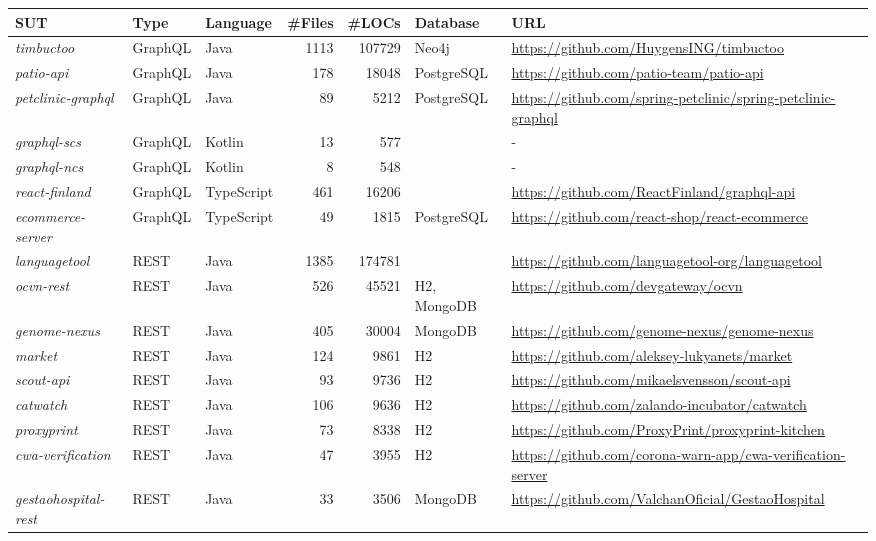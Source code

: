 \begin{tabular}{lll rr ll}\\ 
\toprule 
SUT & Type & Language & \#Files & \#LOCs & Database & URL \\ 
\midrule 
\emph{timbuctoo} &  GraphQL &  Java &  1113 &  107729 &  Neo4j & \url{https://github.com/HuygensING/timbuctoo} \\ 
\emph{patio-api} &  GraphQL &  Java &  178 &  18048 &  PostgreSQL & \url{https://github.com/patio-team/patio-api} \\ 
\emph{petclinic-graphql} &  GraphQL &  Java &  89 &  5212 &  PostgreSQL & \url{https://github.com/spring-petclinic/spring-petclinic-graphql} \\ 
\emph{graphql-scs} &  GraphQL &  Kotlin &  13 &  577 &   & -  \\ 
\emph{graphql-ncs} &  GraphQL &  Kotlin &  8 &  548 &   & -  \\ 
\emph{react-finland} &  GraphQL &  TypeScript &  461 &  16206 &   & \url{https://github.com/ReactFinland/graphql-api} \\ 
\emph{ecommerce-server} &  GraphQL &  TypeScript &  49 &  1815 &  PostgreSQL & \url{https://github.com/react-shop/react-ecommerce} \\ 
\emph{languagetool} &  REST &  Java &  1385 &  174781 &   & \url{https://github.com/languagetool-org/languagetool} \\ 
\emph{ocvn-rest} &  REST &  Java &  526 &  45521 &  H2, MongoDB & \url{https://github.com/devgateway/ocvn} \\ 
\emph{genome-nexus} &  REST &  Java &  405 &  30004 &  MongoDB & \url{https://github.com/genome-nexus/genome-nexus} \\ 
\emph{market} &  REST &  Java &  124 &  9861 &  H2 & \url{https://github.com/aleksey-lukyanets/market} \\ 
\emph{scout-api} &  REST &  Java &  93 &  9736 &  H2 & \url{https://github.com/mikaelsvensson/scout-api} \\ 
\emph{catwatch} &  REST &  Java &  106 &  9636 &  H2 & \url{https://github.com/zalando-incubator/catwatch} \\ 
\emph{proxyprint} &  REST &  Java &  73 &  8338 &  H2 & \url{https://github.com/ProxyPrint/proxyprint-kitchen} \\ 
\emph{cwa-verification} &  REST &  Java &  47 &  3955 &  H2 & \url{https://github.com/corona-warn-app/cwa-verification-server} \\ 
\emph{gestaohospital-rest} &  REST &  Java &  33 &  3506 &  MongoDB & \url{https://github.com/ValchanOficial/GestaoHospital} \\ 

\end{tabular}
